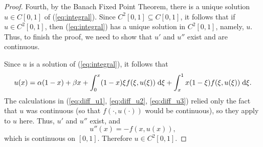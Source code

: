 \documentclass{homework}
\begin{document}
\begin{enumerate}[label=\textbf{(\roman*)}]
\begin{proof}
			Fourth, by the Banach Fixed Point Theorem, there is a unique solution $u \in C[0,1]$ of (\ref{eq:integral}). Since $C^2[0,1] \subseteq C[0,1]$, it follows that if $u \in C^2[0,1]$, then (\ref{eq:integral}) has a unique solution in $C^2[0,1]$, namely, $u$. Thus, to finish the proof, we need to show that $u'$ and $u''$ exist and are continuous.
			
			Since $u$ is a solution of (\ref{eq:integral}), it follows that
			\begin{equation}
				u(x) = \alpha(1-x) + \beta x + \int_0^x (1-x)\xi f(\xi, u(\xi))\;\text{d}\xi + \int_x^1 x(1-\xi)f(\xi,u(\xi))\;\text{d}\xi.
			\end{equation}
			The calculations in (\ref{eq:diff_u1}, \ref{eq:diff_u2}, \ref{eq:diff_u3}) relied only the fact that $u$ was continuous (so that $f(\cdot, u(\cdot))$ would be continuous), so they apply to $u$ here. Thus, $u'$ and $u''$ exist, and
			\begin{equation}
				u''(x) = -f(x, u(x)),
			\end{equation}
			which is continuous on $[0,1]$. Therefore $u \in C^2[0,1]$.
		\end{proof}
	\end{enumerate}
\end{document}
